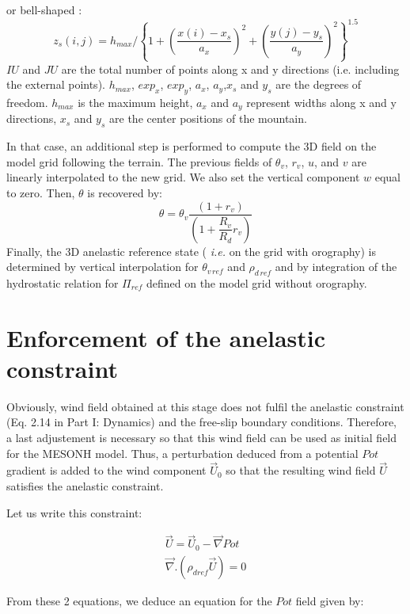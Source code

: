 or bell-shaped :
$$
z_{s}(i,j) = h_{max} / \left\{ 1 + \left(\dfrac{x(i) - x_{s}}{a_{x}}\right)^{2}
+ \left(\dfrac{y(j) - y_{s}}{a_{y}}\right)^{2}
\right\}^{1.5}
$$
$IU$ and $JU$ are the total number of points along x and y directions (i.e.
including the external points). $h_{max}$, $exp_{x}$, $exp_{y}$, $a_{x}$,
$a_{y}$,$x_{s}$ and $y_{s}$ are the  degrees of freedom. $h_{max}$ is the maximum
height, $a_{x}$ and
$a_{y}$ represent widths along x and y directions, $x_{s}$ and $y_{s}$  are
the center
positions of the mountain.

In that case, an additional step is performed
to compute the 3D field on the model grid following the terrain.
The previous fields of $\theta_v$, $r_v$, $u$, and $v$
are linearly interpolated to the new grid. We also set the vertical component
$w$ equal to zero.
Then, $\theta$ is recovered by:
\begin{equation}
\theta = \theta_{v}\dfrac{(1+r_{v})}{(1 + \dfrac{R_{v}}{R_{d}}r_{v})}
\end{equation}
Finally, the  3D anelastic reference state (
{\it i.e.} on the grid with orography) is determined
 by vertical interpolation for  $\theta_{v\,ref}$ and
$\rho_{d\,ref}$ and by integration of the hydrostatic relation for
$\Pi_{ref}$
defined on the model grid without orography.

\section{Enforcement of the anelastic constraint}

Obviously, wind field obtained at this stage does not fulfil the anelastic constraint
(Eq. 2.14 in Part I: Dynamics)
and the free-slip boundary conditions. Therefore, a
last adjustement is necessary so that this wind field can be used as initial
field for the MESONH model. Thus, a perturbation deduced from a potential $Pot$
gradient  is added to the wind component $\vec{U}_0$ so that the resulting
 wind field $\vec{U}$ satisfies the anelastic constraint.

Let us write this constraint:

\begin{eqnarray}
\vec{U} = \vec{U} _0 - \vec {\nabla } Pot  \nonumber \\
\vec { \nabla } . \left( \rho _{dref}  \vec{U}  \right) = 0 \nonumber
\end{eqnarray}

From these 2 equations, we deduce an equation for the $Pot$ field given by:

